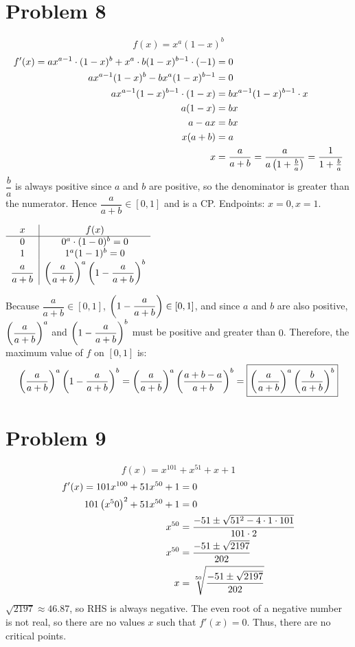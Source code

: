 \documentclass{article}
\newcommand*{\paren}[1]{\ensuremath\left(#1\right)}
\newcommand*{\problem}[1]{\section*{Problem #1}}
\begin{document}
\problem{8}
\begin{equation*}
	f(x)=x^a(1-x)^b
\end{equation*}
\begin{align*}
	f'(x)=ax^{a-1}\cdot(1-x)^b+x^a\cdot b(1-x)^{b-1}\cdot(-1)&=0 \\
	ax^{a-1}(1-x)^b-bx^a(1-x)^{b-1}&=0 \\
	ax^{a-1}(1-x)^{b-1}\cdot(1-x)&=bx^{a-1}(1-x)^{b-1}\cdot x \\
	a(1-x)&=bx \\
	a-ax&=bx \\
	x(a+b)&=a \\
	x&=\frac{a}{a+b}=\frac{a}{a\paren{1+\frac{b}{a}}}=\frac{1}{1+\frac{b}{a}}
\end{align*}
$\dfrac{b}{a}$ is always positive since $a$ and $b$ are positive, so the denominator is greater than the numerator. Hence $\dfrac{a}{a+b}\in[0,1]$ and is a CP. Endpoints: $x=0,x=1$.
\begin{center}
	$\begin{array}{c|c}
		x & f(x) \\
		\hline
		0 & 0^a\cdot(1-0)^b=0 \\
		1 & 1^a(1-1)^b=0 \\
		\dfrac{a}{a+b} & \paren{\dfrac{a}{a+b}}^a\paren{1-\dfrac{a}{a+b}}^b 
	\end{array}$
\end{center}
Because $\dfrac{a}{a+b}\in[0,1]$, $\paren{1-\dfrac{a}{a+b}}\in[0,1]$, and since $a$ and $b$ are also positive, $\paren{\dfrac{a}{a+b}}^a$ and $\paren{1-\dfrac{a}{a+b}}^b$ must be positive and greater than $0$. Therefore, the maximum value of $f$ on $[0,1]$ is:
\begin{equation*}
	\paren{\dfrac{a}{a+b}}^a\paren{1-\dfrac{a}{a+b}}^b=\paren{\dfrac{a}{a+b}}^a\paren{\frac{a+b-a}{a+b}}^b=\boxed{\paren{\dfrac{a}{a+b}}^a\paren{\frac{b}{a+b}}^b}
\end{equation*}

\problem{9}
\begin{equation*}
	f(x)=x^{101}+x^{51}+x+1
\end{equation*}
\begin{align*}
	f'(x)=101x^{100}+51x^{50}+1&=0 \\
	101\paren{x^50}^2+51x^{50}+1&=0 \\
	x^{50}&=\frac{-51\pm\sqrt{51^2-4\cdot1\cdot101}}{101\cdot2} \\
	x^{50}&=\frac{-51\pm\sqrt{2197}}{202} \\
	x&=\sqrt[50]{\frac{-51\pm\sqrt{2197}}{202}} \\
\end{align*}
$\sqrt{2197}\approx46.87$, so RHS is always negative. The even root of a negative number is not real, so there are no values $x$ such that $f'(x)=0$. Thus, there are no critical points.	 
\end{document}
